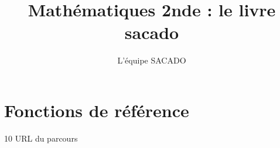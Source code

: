 


\usepackage{tkz-tab}


\title{Mathématiques 2nde  : le livre sacado}
\author{L'équipe SACADO}




\chapter{Fonctions de référence}{10}
{URL du parcours}
{
 \begin{CpsCol}
 \end{CpsCol}

\begin{His}


\end{His}}
